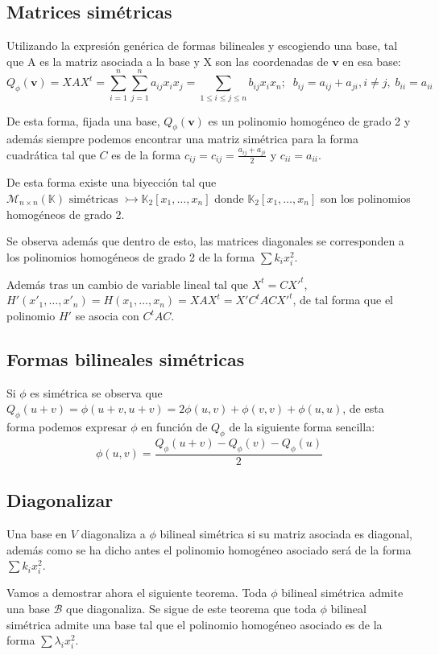 \documentclass{preset}
\begin{document}
\vspace{-25pt}
\subsection{Matrices simétricas}
Utilizando la expresión genérica de formas bilineales y escogiendo una base, tal que A es la matriz asociada a la base y X son las coordenadas de $\textbf{v}$ en esa base:
\vspace{-10pt}
\[Q_\phi(\textbf{v})=XAX^t=\sum_{i=1}^n{\sum_{j=1}^n {a_{ij} x_i x_j}}=\sum_{1\leq i\leq j \leq n}{b_{ij} x_i x_n}; \;\; b_{ij} = a_{ij}+a_{ji}, i\neq j, \; b_{ii} = a_{ii}\]

\vspace{-10pt}
De esta forma, fijada una base, $Q_\phi(\textbf{v})$ es un polinomio homogéneo de grado 2 y además siempre podemos encontrar una matriz simétrica para la forma cuadrática tal que $C$ es de la forma $c_{ij} = c_{ij}= \frac{a_{ij}+a_{ji}}{2}$ y $c_{ii}=a_{ii}$.

De esta forma existe una biyección tal que $\mathcal{M}_{n\times n}(\mathbb{K}) \mbox{ simétricas } \rightarrowtail  \mathbb{K}_2[x_1,\dots,x_n]$ donde $\mathbb{K}_2[x_1,\dots,x_n]$ son los polinomios homogéneos de grado 2.

Se observa además que dentro de esto, las matrices diagonales se corresponden a los polinomios homogéneos de grado 2 de la forma $\sum k_i x_i^2$.

Además tras un cambio de variable lineal tal que $X^t=CX'^t$, $H'(x'_1,\dots,x'_n)=H(x_1,\dots,x_n)=XAX^t=X' C^t A C X'^t$, de tal forma que el polinomio $H'$ se asocia con $C^t A C$.
\vspace{-15pt}
\subsection{Formas bilineales simétricas}
Si $\phi$ es simétrica se observa que $Q_\phi(u+v)=\phi(u+v,u+v)=2\phi(u,v)+\phi(v,v)+\phi(u,u)$, de esta forma podemos expresar $\phi$ en función de $Q_\phi$ de la siguiente forma sencilla:
\vspace{-5pt}
\[\phi(u,v)=\frac{Q_\phi(u+v)-Q_\phi(v)-Q_\phi(u)}{2}\]

\vspace{-15pt}
\subsection{Diagonalizar}
Una base en $V$ diagonaliza a $\phi$ bilineal simétrica si su matriz asociada es diagonal, además como se ha dicho antes el polinomio homogéneo asociado será de la forma $\sum k_i x_i^2$.

Vamos a demostrar ahora el siguiente teorema. Toda $\phi$ bilineal simétrica admite una base $\mathcal{B}$ que diagonaliza. Se sigue de este teorema que toda $\phi$ bilineal simétrica admite una base tal que el polinomio homogéneo asociado es de la forma $\sum \lambda_i x_i^2$.
\end{document}
